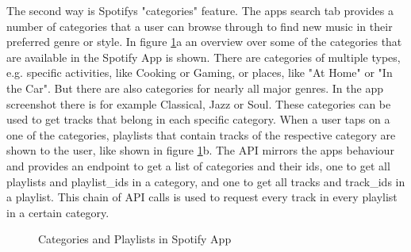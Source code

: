 The second way is Spotifys "categories" feature. The apps search tab provides a number of
categories that a user can browse through to find new music in their preferred genre or style.
In figure \ref{fig:Categories and Playlists in Spotify App}a an overview over some of the categories
that are available in the Spotify App is shown. There are categories of multiple types, e.g.
specific activities, like Cooking or Gaming, or places, like "At Home" or "In the Car".
But there are also categories for nearly all major genres. In the app screenshot
there is for example Classical, Jazz or Soul.
These categories can be used to get tracks that belong in each specific category. When a user taps on
a one of the categories, playlists that contain tracks of the respective category are shown to the user,
like shown in figure \ref{fig:Categories and Playlists in Spotify App}b.
The API mirrors the apps behaviour and provides an endpoint to get a list of categories and their ids,
one to get all playlists and playlist\_ids in a category, and one to get all tracks and track\_ids in
a playlist. This chain of API calls is used to request every track in every playlist in a certain category.

\begin{figure}[H]
    \centering
    \qquad
    \caption{Categories and Playlists in Spotify App}%
    \label{fig:Categories and Playlists in Spotify App}%
\end{figure}


